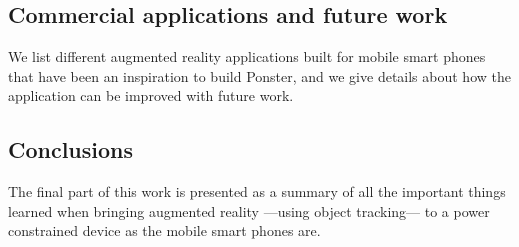 \subsection*{Commercial applications and future work}
We list different augmented reality applications built for mobile smart phones that
have been an inspiration to build Ponster, and we give details about how the
application can be improved with future work.

\subsection*{Conclusions}
The final part of this work is presented as a summary of all the important
things learned when bringing augmented reality ---using object tracking--- to a
power constrained device as the mobile smart phones are.

